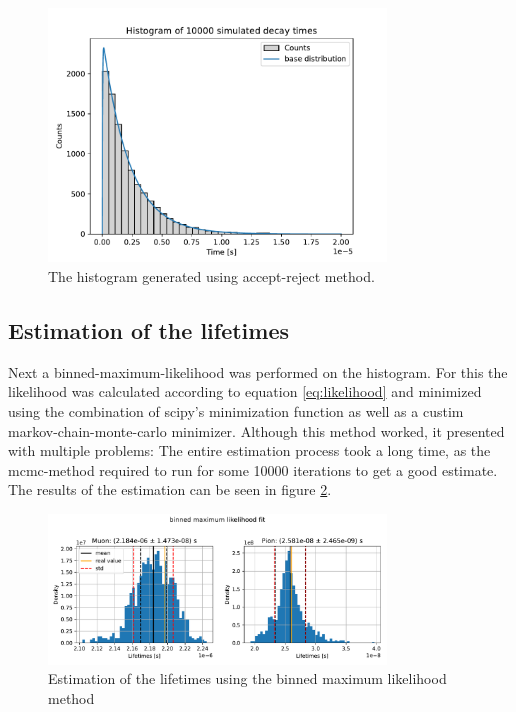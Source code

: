 \documentclass[11pt, a4paper, oneside]{book}
\newcommand\Plotwidth{0.8}
\begin{document}
\begin{figure}[H]
    \centering
    \includegraphics[width=\Plotwidth\textwidth]{images/simulated_decay_histogram.pdf}
    \caption{The histogram generated using accept-reject method.}
    \label{fig:histogram}
\end{figure}

\subsection{Estimation of the lifetimes}
Next a binned-maximum-likelihood was performed on the histogram. For this the likelihood was calculated according to equation \ref{eq:likelihood} and minimized using the combination of scipy's minimization function as well as a custim markov-chain-monte-carlo minimizer. Although this method worked, it presented with multiple problems: The entire estimation process took a long time, as the mcmc-method required to run for some \num{10000} iterations to get a good estimate. The results of the estimation can be seen in figure \ref{fig:likelihood_results}.

\begin{figure}[H]
    \centering
    \includegraphics[width=\Plotwidth\textwidth]{images/estimators_hist_likelihood.pdf}
    \caption{Estimation of the lifetimes using the binned maximum likelihood method}
    \label{fig:likelihood_results}
\end{figure}
\end{document}
